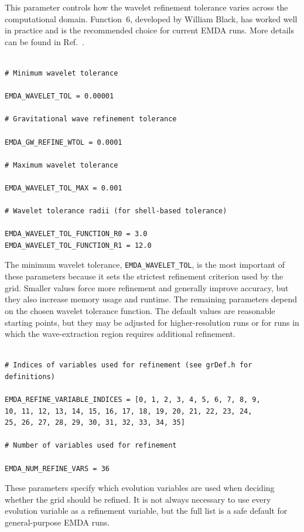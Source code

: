 This parameter controls how the wavelet refinement tolerance varies across the
computational domain. Function~6, developed by William Black, has worked well in
practice and is the recommended choice for current EMDA runs. More details can
be found in Ref.~\cite{Black2025_ORBIT}.

\begin{verbatim}

# Minimum wavelet tolerance

EMDA_WAVELET_TOL = 0.00001

# Gravitational wave refinement tolerance

EMDA_GW_REFINE_WTOL = 0.0001

# Maximum wavelet tolerance

EMDA_WAVELET_TOL_MAX = 0.001

# Wavelet tolerance radii (for shell-based tolerance)

EMDA_WAVELET_TOL_FUNCTION_R0 = 3.0
EMDA_WAVELET_TOL_FUNCTION_R1 = 12.0
\end{verbatim}

The minimum wavelet tolerance, \texttt{EMDA\_WAVELET\_TOL}, is the most important
of these parameters because it sets the strictest refinement criterion used by
the grid. Smaller values force more refinement and generally improve accuracy,
but they also increase memory usage and runtime. The remaining parameters
depend on the chosen wavelet tolerance function. The default values are
reasonable starting points, but they may be adjusted for higher-resolution runs
or for runs in which the wave-extraction region requires additional refinement.

\begin{verbatim}

# Indices of variables used for refinement (see grDef.h for definitions)

EMDA_REFINE_VARIABLE_INDICES = [0, 1, 2, 3, 4, 5, 6, 7, 8, 9,
10, 11, 12, 13, 14, 15, 16, 17, 18, 19, 20, 21, 22, 23, 24,
25, 26, 27, 28, 29, 30, 31, 32, 33, 34, 35]

# Number of variables used for refinement

EMDA_NUM_REFINE_VARS = 36
\end{verbatim}

These parameters specify which evolution variables are used when deciding
whether the grid should be refined. It is not always necessary to use every
evolution variable as a refinement variable, but the full list is a safe default
for general-purpose EMDA runs.

